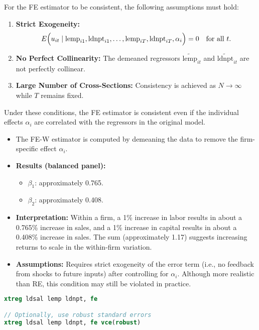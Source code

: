 \documentclass[a4paper,12pt]{article} %
\theoremstyle{nonitalic}
\newenvironment{solution}[1]
  {\renewcommand\theinnercustomsol{#1}\innercustomsol}
  {\endinnercustomsol}
\newcounter{solutionctr}
\renewcommand{\thesolutionctr}{(\alph{solutionctr})}
\newenvironment{autosolution}
  {\stepcounter{solutionctr}\begin{solution}{\thesolutionctr}}
  {\end{solution}}
\begin{document}
\begin{autosolution}
For the FE estimator to be consistent, the following assumptions must hold:
\begin{enumerate}
    \item \textbf{Strict Exogeneity:} 
    \[
    E\Bigl(u_{it}\mid \text{lemp}_{i1}, \text{ldnpt}_{i1}, \dots, \text{lemp}_{iT}, \text{ldnpt}_{iT}, \alpha_i\Bigr)=0 \quad \text{for all } t.
    \]
    \item \textbf{No Perfect Collinearity:} The demeaned regressors \(\tilde{\text{lemp}}_{it}\) and \(\tilde{\text{ldnpt}}_{it}\) are not perfectly collinear.
    \item \textbf{Large Number of Cross-Sections:} Consistency is achieved as \(N \to \infty\) while \(T\) remains fixed.
\end{enumerate}

Under these conditions, the FE estimator is consistent even if the individual effects \(\alpha_i\) are correlated with the regressors in the original model.

\begin{itemize}
    \item The FE-W estimator is computed by demeaning the data to remove the firm-specific effect $\alpha_i$.
    \item \textbf{Results (balanced panel):}
    
    \begin{itemize}
        \item $\beta_1$: approximately 0.765.
        \item $\beta_2$: approximately 0.408.
    \end{itemize}
    \item \textbf{Interpretation:} Within a firm, a 1\% increase in labor results in about a 0.765\% increase in sales, and a 1\% increase in capital results in about a 0.408\% increase in sales. The sum (approximately 1.17) suggests increasing returns to scale in the within-firm variation.
    \item \textbf{Assumptions:} Requires strict exogeneity of the error term (i.e., no feedback from shocks to future inputs) after controlling for $\alpha_i$. Although more realistic than RE, this condition may still be violated in practice.
\end{itemize}

\begin{lstlisting}[language=Stata]
xtreg ldsal lemp ldnpt, fe

// Optionally, use robust standard errors
xtreg ldsal lemp ldnpt, fe vce(robust)

\end{lstlisting}

\end{autosolution}
\end{document}
